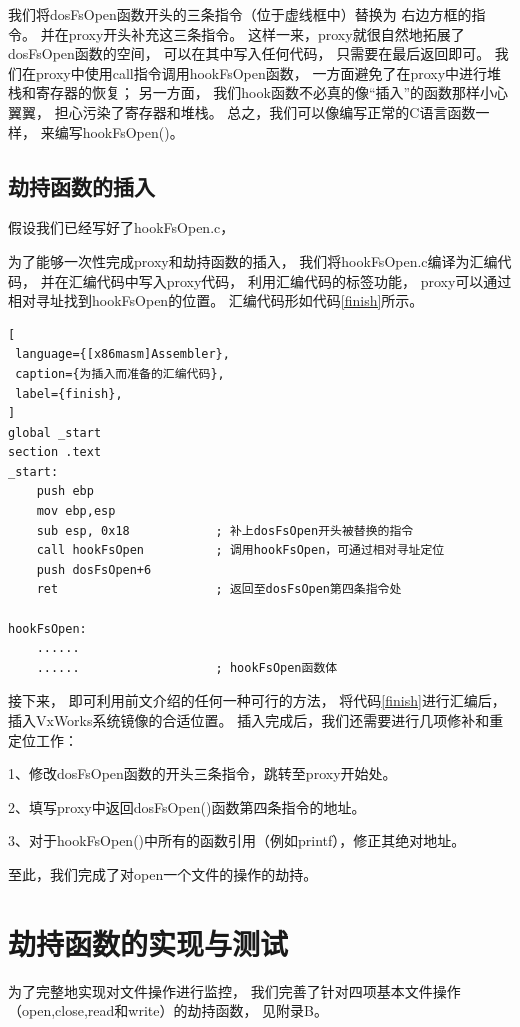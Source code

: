 我们将dosFsOpen函数开头的三条指令（位于虚线框中）替换为
右边方框的指令。
并在proxy开头补充这三条指令。
这样一来，proxy就很自然地拓展了dosFsOpen函数的空间，
可以在其中写入任何代码，
只需要在最后返回即可。
我们在proxy中使用call指令调用hookFsOpen函数，
一方面避免了在proxy中进行堆栈和寄存器的恢复；
另一方面，
我们hook函数不必真的像“插入”的函数那样小心翼翼，
担心污染了寄存器和堆栈。
总之，我们可以像编写正常的C语言函数一样，
来编写hookFsOpen()。

\subsection{劫持函数的插入}

假设我们已经写好了hookFsOpen.c，

为了能够一次性完成proxy和劫持函数的插入，
我们将hookFsOpen.c编译为汇编代码，
并在汇编代码中写入proxy代码，
利用汇编代码的标签功能，
proxy可以通过相对寻址找到hookFsOpen的位置。
汇编代码形如代码\ref{finish}所示。
\begin{lstlisting}[
 language={[x86masm]Assembler},
 caption={为插入而准备的汇编代码},
 label={finish},
]
global _start
section .text
_start:
    push ebp
    mov ebp,esp
    sub esp, 0x18            ; 补上dosFsOpen开头被替换的指令
    call hookFsOpen          ; 调用hookFsOpen，可通过相对寻址定位
    push dosFsOpen+6
    ret                      ; 返回至dosFsOpen第四条指令处

hookFsOpen:
    ......
    ......                   ; hookFsOpen函数体
\end{lstlisting}

接下来，
即可利用前文介绍的任何一种可行的方法，
将代码\ref{finish}进行汇编后，
插入VxWorks系统镜像的合适位置。
插入完成后，我们还需要进行几项修补和重定位工作：

1、修改dosFsOpen函数的开头三条指令，跳转至proxy开始处。

2、填写proxy中返回dosFsOpen()函数第四条指令的地址。

3、对于hookFsOpen()中所有的函数引用（例如printf），修正其绝对地址。

至此，我们完成了对open一个文件的操作的劫持。


\section{劫持函数的实现与测试}

为了完整地实现对文件操作进行监控，
我们完善了针对四项基本文件操作（open,close,read和write）的劫持函数，
见附录B。

